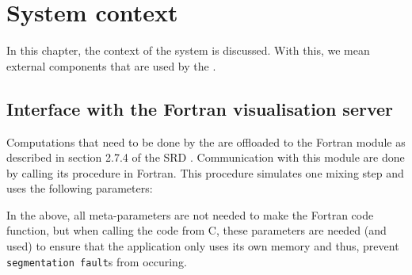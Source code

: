 \chapter{System context}
\label{chap:systcontext}
In this chapter, the context of the system is discussed. With this, we mean external components that are used by the \applicationname{}.

\section{Interface with the Fortran visualisation server}
Computations that need to be done by the \applicationname{} are offloaded to the Fortran module as described in section 2.7.4 of the SRD \cite{srd}. Communication with this module are done by calling its procedure in Fortran. This procedure simulates one mixing step and uses the following parameters:

\begin{center}
\end{center}

\noindent In the above, all meta-parameters are not needed to make the Fortran code function, but when calling the code from C, these parameters are needed (and used) to ensure that the application only uses its own memory and thus, prevent \texttt{segmentation fault}s from occuring.